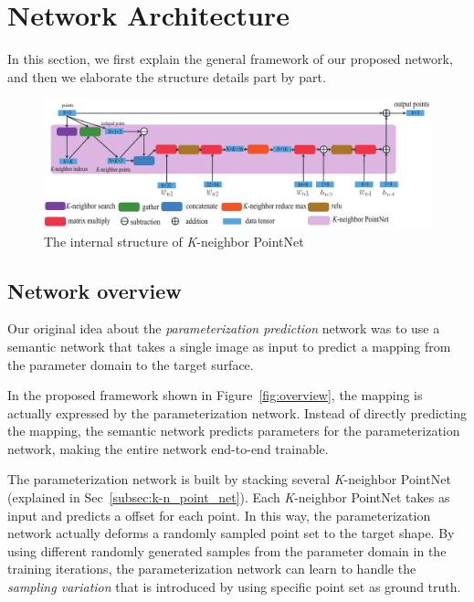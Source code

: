 \section{Network Architecture}
\label{sec:net}


In this section, we first explain the general framework of our proposed network, and then we elaborate the structure details part by part.

\begin{figure}[htbp]
	\centering
	\includegraphics[width=\linewidth]{img/net/k-n_pointnet}
	\caption{The internal structure of \textit{K}-neighbor PointNet}
	\label{fig:knpointnet}
\end{figure}

\subsection{Network overview}
\label{subsec:overview}
Our original idea about the \emph{parameterization prediction} network was to use a semantic network that takes a single image as input to predict a mapping from the parameter domain to the target surface. 
%


In the proposed framework shown in Figure~\ref{fig:overview}, the mapping is actually expressed by the parameterization network. 
Instead of directly predicting the mapping, the semantic network predicts parameters for the parameterization network, making the entire network end-to-end trainable.

The parameterization network is built by stacking several \textit{K}-neighbor PointNet (explained in Sec~\ref{subsec:k-n_point_net}). 
Each \textit{K}-neighbor PointNet takes  as input and predicts a offset for each point. 
In this way, the parameterization network actually deforms a randomly sampled point set to the target shape.
%
By using different randomly generated samples from the parameter domain in the training iterations, the parameterization network can learn to handle the \textit{sampling variation} that is introduced by using specific point set as ground truth. 

